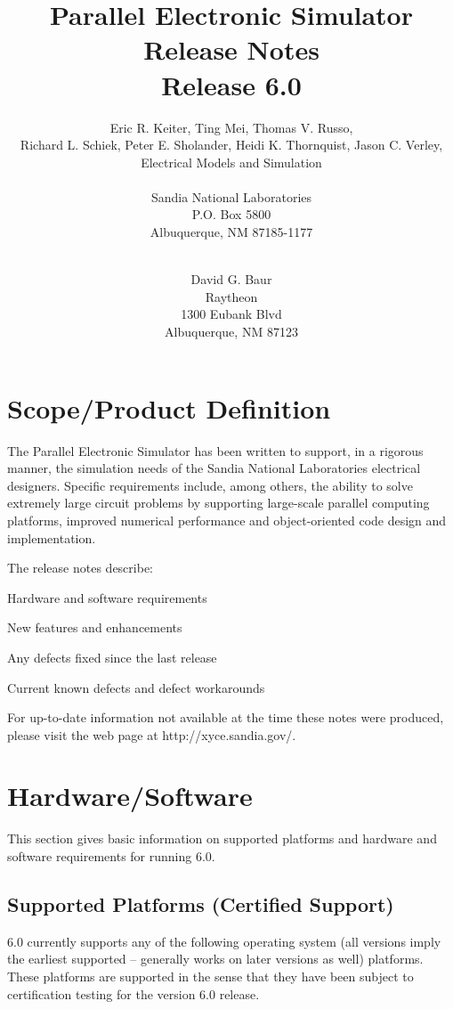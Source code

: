 \documentclass[11pt,report,strict]{SANDreport}
\title{\XyceTitle{} Parallel Electronic Simulator Release Notes\\Release 6.0}
\date{}
\author{Eric R. Keiter, 
            Ting Mei, 
            Thomas V. Russo, \\
            Richard L. Schiek, 
            Peter E. Sholander,
            Heidi K. Thornquist,
            Jason C. Verley,\\
            Electrical Models and Simulation \\[1ex]
\\
            Sandia National Laboratories\\
            P.O. Box 5800\\
            Albuquerque, NM 87185-1177 \\
\\
\and 
David G. Baur\\
  Raytheon\\
  1300 Eubank Blvd\\
  Albuquerque, NM 87123 \\
}
\begin{document}
\maketitle

%
\SANDmain		%
\section{Scope/Product Definition}

The \Xyce{} Parallel Electronic Simulator has been written to support, in a
rigorous manner, the simulation needs of the Sandia National Laboratories
electrical designers.  Specific requirements include, among others, the
ability to solve extremely large circuit problems by supporting large-scale
parallel computing platforms, improved numerical performance and
object-oriented code design and implementation.

The \Xyce{} release notes describe:
\begin{XyceItemize}
  \item Hardware and software requirements
  \item New features and enhancements
  \item Any defects fixed since the last release
  \item Current known defects and defect workarounds
\end{XyceItemize}

For up-to-date information not available at the time these notes 
were produced, please visit the \Xyce{} web page at 
{\color{XyceDeepRed} http://xyce.sandia.gov/}.


\section{Hardware/Software}
This section gives basic information on supported platforms and hardware
and software requirements for running \Xyce{} 6.0.

\subsection{Supported Platforms (Certified Support)}
\Xyce{} 6.0 currently supports any of the following operating system (all
versions imply the earliest supported -- \Xyce{} generally works on later
versions as well) platforms.  These platforms are supported in the sense
that they have been subject to certification testing for the \Xyce{} version 
6.0 release.  
\end{document}
